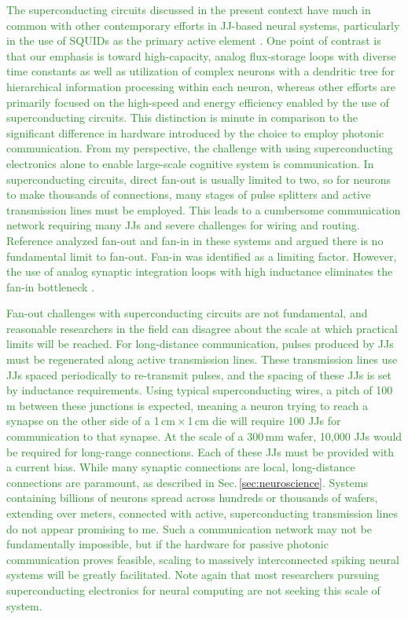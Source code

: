\documentclass[twocolumn]{article}
\newcommand{\onlinecite}[1]{\hspace{-1 ex} \nocite{#1}\citenum{#1}}
\begin{document}
\textcolor{ForestGreen}{The superconducting circuits discussed in the present context have much in common with other contemporary efforts in JJ-based neural systems, particularly in the use of SQUIDs as the primary active element \cite{crsc2010,scdo2018b}. One point of contrast is that our emphasis is toward high-capacity, analog flux-storage loops with diverse time constants as well as utilization of complex neurons with a dendritic tree for hierarchical information processing within each neuron, whereas other efforts are primarily focused on the high-speed \cite{sele2017} and energy efficiency \cite{klsc2018} enabled by the use of superconducting circuits. This distinction is minute in comparison to the significant difference in hardware introduced by the choice to employ photonic communication. From my perspective, the challenge with using superconducting electronics alone to enable large-scale cognitive system is communication. In superconducting circuits, direct fan-out is usually limited to two, so for neurons to make thousands of connections, many stages of pulse splitters and active transmission lines must be employed. This leads to a cumbersome communication network requiring many JJs and severe challenges for wiring and routing. Reference \onlinecite{scse2020} analyzed fan-out and fan-in in these systems and argued there is no fundamental limit to fan-out. Fan-in was identified as a limiting factor. However, the use of analog synaptic integration loops with high inductance eliminates the fan-in bottleneck \cite{sh2019}.}

\textcolor{ForestGreen}{Fan-out challenges with superconducting circuits are not fundamental, and reasonable researchers in the field can disagree about the scale at which practical limits will be reached. For long-distance communication, pulses produced by JJs must be regenerated along active transmission lines. These transmission lines use JJs spaced periodically to re-transmit pulses, and the spacing of these JJs is set by inductance requirements. Using typical superconducting wires, a pitch of 100\,\textmu m between these junctions is expected, meaning a neuron trying to reach a synapse on the other side of a 1\,cm\,$\times$\,1\,cm die will require 100 JJs for communication to that synapse. At the scale of a 300\,mm wafer, 10,000 JJs would be required for long-range connections. Each of these JJs must be provided with a current bias. While many synaptic connections are local, long-distance connections are paramount, as described in Sec.\,\ref{sec:neuroscience}. Systems containing billions of neurons spread across hundreds or thousands of wafers, extending over meters, connected with active, superconducting transmission lines do not appear promising to me. Such a communication network may not be fundamentally impossible, but if the hardware for passive photonic communication proves feasible, scaling to massively interconnected spiking neural systems will be greatly facilitated. Note again that most researchers pursuing superconducting electronics for neural computing are not seeking this scale of system.}
\end{document}
